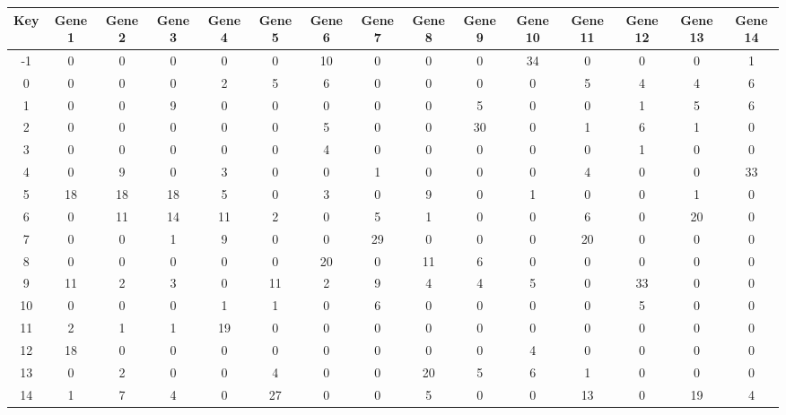 \begin{tabular}{|c|c|c|c|c|c|c|c|c|c|c|c|c|c|c|}
\hline
Key & Gene 1 & Gene 2 & Gene 3 & Gene 4 & Gene 5 & Gene 6 & Gene 7 & Gene 8 & Gene 9 & Gene 10 & Gene 11 & Gene 12 & Gene 13 & Gene 14 \\
\hline
-1 & 0 & 0 & 0 & 0 & 0 & 10 & 0 & 0 & 0 & 34 & 0 & 0 & 0 & 1 \\
0 & 0 & 0 & 0 & 2 & 5 & 6 & 0 & 0 & 0 & 0 & 5 & 4 & 4 & 6 \\
1 & 0 & 0 & 9 & 0 & 0 & 0 & 0 & 0 & 5 & 0 & 0 & 1 & 5 & 6 \\
2 & 0 & 0 & 0 & 0 & 0 & 5 & 0 & 0 & 30 & 0 & 1 & 6 & 1 & 0 \\
3 & 0 & 0 & 0 & 0 & 0 & 4 & 0 & 0 & 0 & 0 & 0 & 1 & 0 & 0 \\
4 & 0 & 9 & 0 & 3 & 0 & 0 & 1 & 0 & 0 & 0 & 4 & 0 & 0 & 33 \\
5 & 18 & 18 & 18 & 5 & 0 & 3 & 0 & 9 & 0 & 1 & 0 & 0 & 1 & 0 \\
6 & 0 & 11 & 14 & 11 & 2 & 0 & 5 & 1 & 0 & 0 & 6 & 0 & 20 & 0 \\
7 & 0 & 0 & 1 & 9 & 0 & 0 & 29 & 0 & 0 & 0 & 20 & 0 & 0 & 0 \\
8 & 0 & 0 & 0 & 0 & 0 & 20 & 0 & 11 & 6 & 0 & 0 & 0 & 0 & 0 \\
9 & 11 & 2 & 3 & 0 & 11 & 2 & 9 & 4 & 4 & 5 & 0 & 33 & 0 & 0 \\
10 & 0 & 0 & 0 & 1 & 1 & 0 & 6 & 0 & 0 & 0 & 0 & 5 & 0 & 0 \\
11 & 2 & 1 & 1 & 19 & 0 & 0 & 0 & 0 & 0 & 0 & 0 & 0 & 0 & 0 \\
12 & 18 & 0 & 0 & 0 & 0 & 0 & 0 & 0 & 0 & 4 & 0 & 0 & 0 & 0 \\
13 & 0 & 2 & 0 & 0 & 4 & 0 & 0 & 20 & 5 & 6 & 1 & 0 & 0 & 0 \\
14 & 1 & 7 & 4 & 0 & 27 & 0 & 0 & 5 & 0 & 0 & 13 & 0 & 19 & 4 \\
\hline
\end{tabular}